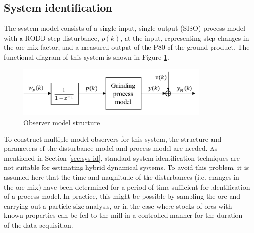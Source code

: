 \subsection{System identification} \label{sec:grind1-sysid}

The system model consists of a single-input, single-output (SISO) process model with a \gls{RODD} step disturbance, $p(k)$, at the input, representing step-changes in the ore mix factor, and a measured output of the P80 of the ground product. The functional diagram of this system is shown in Figure \ref{fig:grind1_obs_model}.
\begin{figure}[ht]
	\centering
	\includegraphics[width=9.5cm]{images/grind1-obs-model-diag.pdf}
	\caption{Observer model structure}
	\label{fig:grind1_obs_model}
\end{figure}

To construct multiple-model observers for this system, the structure and parameters of the disturbance model and process model are needed. As mentioned in Section \ref{sec:sys-id}, standard system identification techniques are not suitable for estimating hybrid dynamical systems. To avoid this problem, it is assumed here that the time and magnitude of the disturbances (i.e. changes in the ore mix) have been determined for a period of time sufficient for identification of a process model. In practice, this might be possible by sampling the ore and carrying out a particle size analysis, or in the case where stocks of ores with known properties can be fed to the mill in a controlled manner for the duration of the data acquisition.

